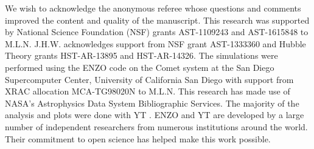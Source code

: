 \documentclass[iop,apj]{emulateapj}
\begin{document}
\acknowledgments

We wish to acknowledge the anonymous referee whose questions and comments improved the content and quality of the manuscript. This research was supported by National Science Foundation (NSF) grants
AST-1109243 and AST-1615848 to M.L.N. J.H.W. acknowledges support from NSF grant AST-1333360 and Hubble Theory grants HST-AR-13895 and HST-AR-14326. The simulations were performed using the ENZO code on the Comet  system at the San Diego Supercomputer Center, University of California San Diego with support from XRAC allocation MCA-TG98020N to M.L.N. This research has made use of NASA's Astrophysics Data System Bibliographic Services. The majority of the analysis and plots were done with YT \citep{yt_full_paper}. ENZO and YT are developed by a large number of independent researchers from numerous institutions around the world. Their commitment to open science has helped make this work possible. 


\end{document}
